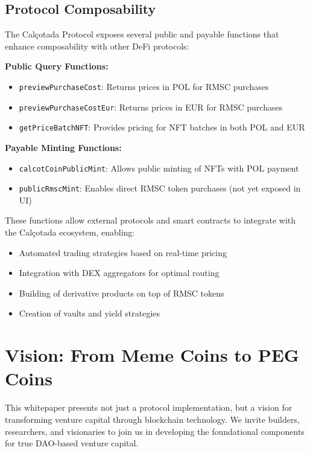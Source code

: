 \documentclass[conference]{IEEEtran}
\begin{document}
\subsection{Protocol Composability}

The Calçotada Protocol exposes several public and payable functions that enhance composability with other DeFi protocols:

\textbf{Public Query Functions:}
\begin{itemize}
    \item \texttt{previewPurchaseCost}: Returns prices in POL for RMSC purchases
    \item \texttt{previewPurchaseCostEur}: Returns prices in EUR for RMSC purchases
    \item \texttt{getPriceBatchNFT}: Provides pricing for NFT batches in both POL and EUR
\end{itemize}

\textbf{Payable Minting Functions:}
\begin{itemize}
    \item \texttt{calcotCoinPublicMint}: Allows public minting of NFTs with POL payment
    \item \texttt{publicRmscMint}: Enables direct RMSC token purchases (not yet exposed in UI)
\end{itemize}

These functions allow external protocols and smart contracts to integrate with the Calçotada ecosystem, enabling:
\begin{itemize}
    \item Automated trading strategies based on real-time pricing
    \item Integration with DEX aggregators for optimal routing
    \item Building of derivative products on top of RMSC tokens
    \item Creation of vaults and yield strategies
\end{itemize}

\section{Vision: From Meme Coins to PEG Coins}

This whitepaper presents not just a protocol implementation, but a vision for transforming venture capital through blockchain technology. We invite builders, researchers, and visionaries to join us in developing the foundational components for true DAO-based venture capital.
\end{document}
